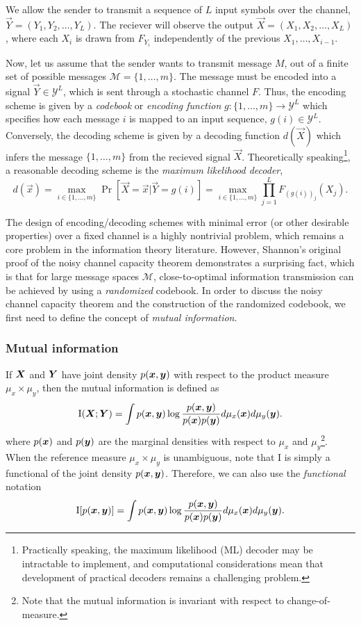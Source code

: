 We allow the sender to transmit a sequence of $L$ input symbols over
the channel, $\vec{Y} = (Y_1,Y_2,\hdots, Y_L)$. The reciever will observe the
output $\vec{X} = (X_1,X_2,\hdots, X_L)$, where each $X_i$ is drawn from
$F_{Y_i}$ independently of the previous $X_1,\hdots, X_{i-1}$.

Now, let us assume that the sender wants to transmit message $M$, out
of a finite set of possible messages $\mathcal{M} = \{1,\hdots, m\}$.
The message must be encoded into a signal $\vec{Y} \in \mathcal{Y}^L$,
which is sent through a stochastic channel $F$.  Thus, the encoding
scheme is given by a \emph{codebook} or \emph{encoding function} $g:
\{1,\hdots, m\} \to \mathcal{Y}^L$ which specifies how each message
$i$ is mapped to an input sequence, $g(i) \in \mathcal{Y}^L$.
Conversely, the decoding scheme is given by a decoding function
$d(\vec{X})$ which infers the message $\{1,\hdots, m\}$ from the
recieved signal $\vec{X}$.  Theoretically
speaking\footnote{Practically speaking, the maximum likelihood (ML)
  decoder may be intractable to implement, and computational
  considerations mean that development of practical decoders remains a
  challenging problem.}, a reasonable decoding scheme is the
\emph{maximum likelihood decoder},
\[
d(\vec{x}) = \max_{i \in \{1,\hdots, m\}} \Pr[\vec{X} = \vec{x}| \vec{Y} = g(i)] = \max_{i \in \{1,\hdots, m\}} \prod_{j=1}^L F_{(g(i))_j}(X_j).
\]

The design of encoding/decoding schemes with minimal error (or other
desirable properties) over a fixed channel is a highly nontrivial
problem, which remains a core problem in the information theory
literature.  However, Shannon's original proof of the noisy channel
capacity theorem demonstrates a surprising fact, which is that for
large message spaces $\mathcal{M}$, close-to-optimal information
transmission can be achieved by using a \emph{randomized} codebook.
In order to discuss the noisy channel capacity theorem and the
construction of the randomized codebook, we first need to define
the concept of \emph{mutual information}.

\subsubsection{Mutual information}

If $\boldsymbol{X}$ and $\boldsymbol{Y}$ have joint density $p(\boldsymbol{x}, \boldsymbol{y})$ with respect to
the product measure $\mu_x \times \mu_y$, then the mutual information
is defined as
\[
\text{I}(\boldsymbol{X};\boldsymbol{Y}) = \int p(\boldsymbol{x}, \boldsymbol{y}) \log \frac{p(\boldsymbol{x}, \boldsymbol{y})}{p(\boldsymbol{x})p(\boldsymbol{y})}d\mu_x(\boldsymbol{x}) d\mu_y(\boldsymbol{y}).
\]
where $p(\boldsymbol{x})$ and $p(\boldsymbol{y})$ are the marginal densities with respect to
$\mu_x$ and $\mu_y$\footnote{Note that the mutual information is
  invariant with respect to change-of-measure.}.  When the reference
measure $\mu_x \times \mu_y$ is unambiguous, note that $\text{I}$ is
simply a functional of the joint density $p(\boldsymbol{x}, \boldsymbol{y})$.  Therefore, we
can also use the \emph{functional} notation
\[
\text{I}[p(\boldsymbol{x}, \boldsymbol{y})] = \int p(\boldsymbol{x}, \boldsymbol{y}) \log \frac{p(\boldsymbol{x}, \boldsymbol{y})}{p(\boldsymbol{x})p(\boldsymbol{y})}d\mu_x(\boldsymbol{x}) d\mu_y(\boldsymbol{y}).
\]


